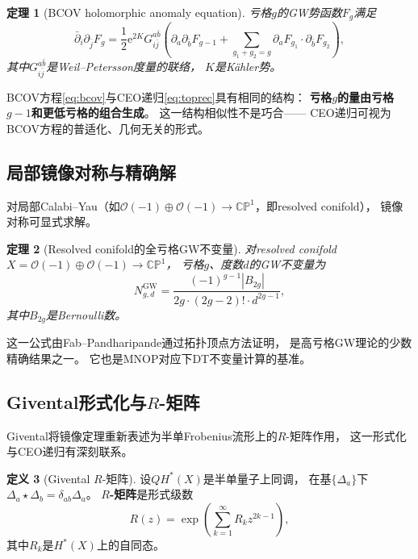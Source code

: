 \documentclass[11pt,a4paper]{article}
\theoremstyle{plain}
\newtheorem{theorem}{定理}[section]
\theoremstyle{definition}
\newtheorem{definition}[theorem]{定义}
\newcommand{\CP}{\mathbb{CP}}
\newcommand{\Ocal}{\mathcal{O}}
\newcommand{\ee}{\mathrm{e}}
\newcommand{\GWinv}{N^{\mathrm{GW}}}
\begin{document}
\begin{theorem}[BCOV holomorphic anomaly equation]\label{thm:bcov}
亏格$g$的GW势函数$F_g$满足
\begin{equation}\label{eq:bcov}
\bar\partial_i \partial_{\bar j} F_g
= \frac{1}{2} \ee^{2K} G_{i\bar j}^{a\bar b}
\left( \partial_a \partial_{\bar b} F_{g-1}
+ \sum_{g_1+g_2=g} \partial_a F_{g_1} \cdot \partial_{\bar b} F_{g_2} \right),
\end{equation}
其中$G_{i\bar j}^{a\bar b}$是Weil--Petersson度量的联络，
$K$是Kähler势。
\end{theorem}

BCOV方程\eqref{eq:bcov}与CEO递归\eqref{eq:toprec}具有相同的结构：
\textbf{亏格$g$的量由亏格$g-1$和更低亏格的组合生成}。
这一结构相似性不是巧合——
CEO递归可视为BCOV方程的普适化、几何无关的形式。

\subsection{局部镜像对称与精确解}

对局部Calabi--Yau（如$\Ocal(-1) \oplus \Ocal(-1) \to \CP^1$，即resolved conifold），
镜像对称可显式求解。

\begin{theorem}[Resolved conifold的全亏格GW不变量]\label{thm:conifold}
对resolved conifold $X = \Ocal(-1) \oplus \Ocal(-1) \to \CP^1$，
亏格$g$、度数$d$的GW不变量为
\begin{equation}\label{eq:conifold}
\GWinv_{g, d} = \frac{(-1)^{g-1} |B_{2g}|}{2g \cdot (2g-2)! \cdot d^{2g-1}},
\end{equation}
其中$B_{2g}$是Bernoulli数。
\end{theorem}

这一公式由Fab--Pandharipande通过拓扑顶点方法证明，
是高亏格GW理论的少数精确结果之一。
它也是MNOP对应下DT不变量计算的基准。

\subsection{Givental形式化与$R$-矩阵}

Givental将镜像定理重新表述为半单Frobenius流形上的$R$-矩阵作用，
这一形式化与CEO递归有深刻联系。

\begin{definition}[Givental $R$-矩阵]\label{def:rmatrix}
设$QH^*(X)$是半单量子上同调，
在基$\{\Delta_a\}$下$\Delta_a \star \Delta_b = \delta_{ab} \Delta_a$。
\textbf{$R$-矩阵}是形式级数
\begin{equation}\label{eq:rmatrix}
R(z) = \exp\left( \sum_{k=1}^\infty R_k z^{2k-1} \right),
\end{equation}
其中$R_k$是$H^*(X)$上的自同态。
\end{definition}
\end{document}
